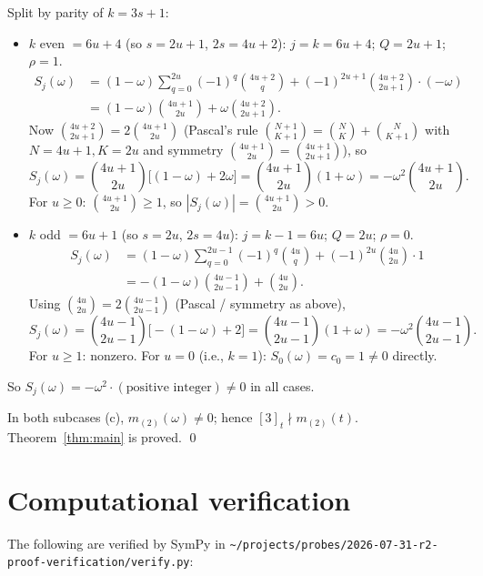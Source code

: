\documentclass[11pt]{article}
\theoremstyle{definition}
\theoremstyle{remark}
\begin{document}
Split by parity of $k = 3s+1$:
\begin{itemize}
\item $k$ even $= 6u + 4$ (so $s = 2u+1$, $2s = 4u+2$): $j = k = 6u+4$; $Q = 2u+1$; $\rho = 1$.
\begin{align*}
S_j(\omega) &= (1 - \omega)\sum_{q=0}^{2u} (-1)^q \binom{4u+2}{q} + (-1)^{2u+1}\binom{4u+2}{2u+1} \cdot (-\omega) \\
&= (1 - \omega)\binom{4u+1}{2u} + \omega \binom{4u+2}{2u+1}.
\end{align*}
Now $\binom{4u+2}{2u+1} = 2\binom{4u+1}{2u}$ (Pascal's rule $\binom{N+1}{K+1} = \binom{N}{K} + \binom{N}{K+1}$ with $N = 4u+1, K = 2u$ and symmetry $\binom{4u+1}{2u} = \binom{4u+1}{2u+1}$), so
\[
S_j(\omega) = \binom{4u+1}{2u}\bigl[(1-\omega) + 2\omega\bigr] = \binom{4u+1}{2u}(1 + \omega) = -\omega^2 \binom{4u+1}{2u}.
\]
For $u \ge 0$: $\binom{4u+1}{2u} \ge 1$, so $|S_j(\omega)| = \binom{4u+1}{2u} > 0$.

\item $k$ odd $= 6u + 1$ (so $s = 2u$, $2s = 4u$): $j = k-1 = 6u$; $Q = 2u$; $\rho = 0$.
\begin{align*}
S_j(\omega) &= (1 - \omega)\sum_{q=0}^{2u-1} (-1)^q \binom{4u}{q} + (-1)^{2u}\binom{4u}{2u} \cdot 1 \\
&= -(1-\omega)\binom{4u-1}{2u-1} + \binom{4u}{2u}.
\end{align*}
Using $\binom{4u}{2u} = 2\binom{4u-1}{2u-1}$ (Pascal / symmetry as above),
\[
S_j(\omega) = \binom{4u-1}{2u-1}\bigl[-(1-\omega) + 2\bigr] = \binom{4u-1}{2u-1}(1+\omega) = -\omega^2 \binom{4u-1}{2u-1}.
\]
For $u \ge 1$: nonzero. For $u = 0$ (i.e., $k = 1$): $S_0(\omega) = c_0 = 1 \ne 0$ directly.
\end{itemize}
So $S_j(\omega) = -\omega^2 \cdot (\text{positive integer}) \ne 0$ in all cases.

\medskip
In both subcases (c), $m_{(2)}(\omega) \ne 0$; hence $[3]_t \nmid m_{(2)}(t)$.
Theorem~\ref{thm:main} is proved. \qed

\section{Computational verification}

The following are verified by SymPy in
\texttt{\~{}/projects/probes/2026-07-31-r2-proof-verification/verify.py}:
\end{document}
